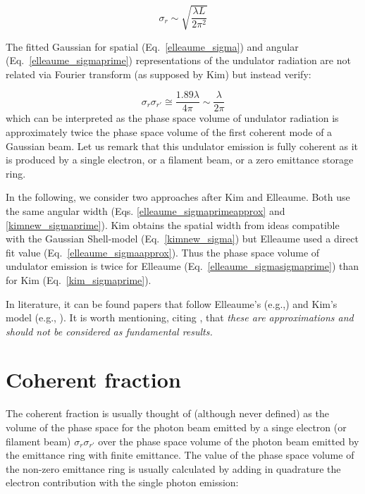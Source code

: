\documentclass{iucr}              %
\begin{document}
\begin{equation}
\sigma_r  \sim \sqrt{\frac{\lambda L}{2 \pi^2}}
\label{elleaume_sigmaapprox}
\end{equation}

The fitted Gaussian for spatial (Eq.~\ref{elleaume_sigma}) and angular (Eq.~\ref{elleaume_sigmaprime}) representations of the undulator radiation are not related via Fourier transform (as supposed by Kim) but instead verify: 

\begin{equation}
\sigma_r  \sigma_{r'} \cong \frac{1.89 \lambda}{4 \pi} \sim \frac{\lambda}{2 \pi}
\label{elleaume_sigmasigmaprime}
\end{equation}
which can be interpreted as the phase space volume of undulator radiation is approximately twice the phase space volume of the first coherent mode of a Gaussian beam. Let us remark that this undulator emission is fully coherent as it is produced by a single electron, or a filament beam, or a zero emittance storage ring. 
% 

In the following, we consider two approaches after Kim and Elleaume. Both use the same angular width (Eqs. \ref{elleaume_sigmaprimeapprox} and \ref{kimnew_sigmaprime}). Kim obtains the spatial width from ideas compatible with the  Gaussian Shell-model (Eq.~\ref{kimnew_sigma}) but Elleaume used a direct fit value (Eq.~\ref{elleaume_sigmaapprox}). Thus the phase space volume of undulator emission is twice for Elleaume (Eq.~\ref{elleaume_sigmasigmaprime}) than for Kim (Eq.~\ref{kim_sigmaprime}). 

In literature, it can be found papers that follow Elleaume's (e.g.,\cite{borland2012,hettel2014}) and Kim's model (e.g., \cite{huang2013}). It is worth mentioning, citing \cite{elleaume}, that {\it these are approximations and should not be considered as fundamental results.} 

\section{Coherent fraction}

The coherent fraction is usually thought of (although never defined) as the volume of the phase space for the photon beam emitted by a singe electron (or filament beam) $\sigma_r \sigma_{r\prime}$ over the phase space volume of the photon beam emitted by the emittance ring with finite emittance. The value of the phase space volume of the non-zero emittance ring is usually calculated by adding in quadrature the electron contribution with the single photon emission:
\end{document}

